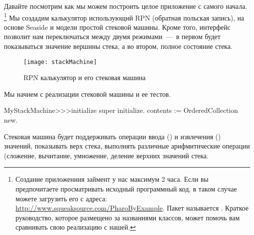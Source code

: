 \documentclass[a4paper,10pt,twoside]{book}
\begin{document}
Давайте посмотрим как мы можем построить целое приложение с самого начала.
\footnote{Создание приложениия займент у нас максимум 2 часа.
Если вы предпочитаете просматривать исходный программный код,
в таком случае можете загрузить его с адреса:
\url{http://www.squeaksource.com/PharoByExample}.
Пакет называется .
Краткое руководство, которое размещено за названиями классов,
может помочь вам сравнивать свою реализацию с нашей.}
Мы создадим калькулятор использующий RPN (обратная польская запись),
на основе Seaside и модели простой стековой машины.
Кроме того, интерфейс позволит нам переключаться между
двумя режимами \,---\, в первом будет показываться значение
вершины стека, а во втором, полное состояние стека.

\begin{figure}[ht]
\begin{center}
\texttt{[image: stackMachine]}
\caption{RPN калькулятор и его стековая машина}
\end{center}
\end{figure}


Мы начнем с реализации стековой машины и ее тестов.



\begin{code}{}
MyStackMachine>>>initialize
	super initialize.
	contents := OrderedCollection new.
\end{code}


Стековая машина будет поддерживать операции ввода () и
извлечения () значений, показывать верх стека,
выполнять различные арифмитические операции (сложение, вычитание,
умножение, деление верхних значений стека.

\end{document}
